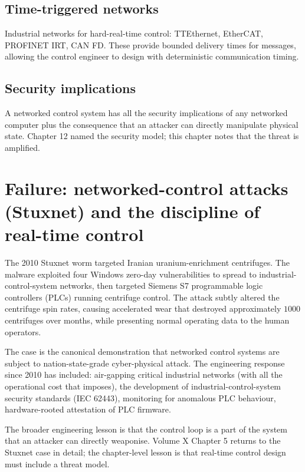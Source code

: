 \subsection{Time-triggered networks}

Industrial networks for hard-real-time control: TTEthernet, EtherCAT, PROFINET IRT, CAN FD. These provide bounded delivery times for messages, allowing the control engineer to design with deterministic communication timing.

\subsection{Security implications}

A networked control system has all the security implications of any networked computer plus the consequence that an attacker can directly manipulate physical state. Chapter 12 named the security model; this chapter notes that the threat is amplified.

\section{Failure: networked-control attacks (Stuxnet) and the discipline of real-time control}

The 2010 Stuxnet worm targeted Iranian uranium-enrichment centrifuges. The malware exploited four Windows zero-day vulnerabilities to spread to industrial-control-system networks, then targeted Siemens S7 programmable logic controllers (PLCs) running centrifuge control. The attack subtly altered the centrifuge spin rates, causing accelerated wear that destroyed approximately $1000$ centrifuges over months, while presenting normal operating data to the human operators.

The case is the canonical demonstration that networked control systems are subject to nation-state-grade cyber-physical attack. The engineering response since 2010 has included: air-gapping critical industrial networks (with all the operational cost that imposes), the development of industrial-control-system security standards (IEC 62443), monitoring for anomalous PLC behaviour, hardware-rooted attestation of PLC firmware.

The broader engineering lesson is that the control loop is a part of the system that an attacker can directly weaponise. Volume X Chapter 5 returns to the Stuxnet case in detail; the chapter-level lesson is that real-time control design must include a threat model.

